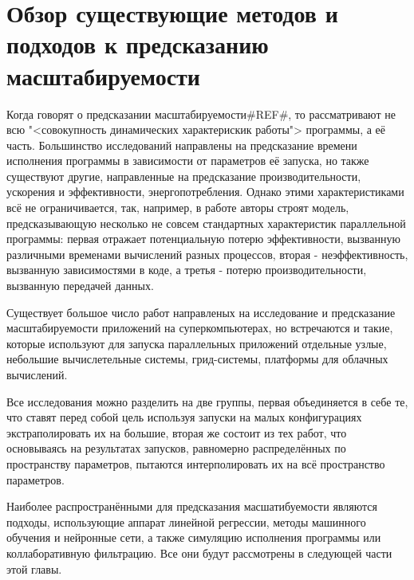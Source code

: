 \chapter{Обзор существующие методов и подходов к предсказанию масштабируемости}
	Когда говорят о предсказании масштабируемости\#REF\#, то рассматривают не всю "<совокупность динамических характерискик работы"> программы, а её часть. Большинство исследований направлены на предсказание времени исполнения программы в зависимости от параметров её запуска, но также существуют другие, направленные на предсказание производительности, ускорения и эффективности, энергопотребления. Однако этими характеристиками всё не ограничивается, так, например, в работе \cite{efficiency_prediction} авторы строят модель, предсказывающую несколько не совсем стандартных характеристик параллельной программы: первая отражает потенциальную потерю эффективности, вызванную различными временами вычислений разных процессов, вторая - неэффективность, вызванную зависимостями в коде, а третья - потерю производительности, вызванную передачей данных.

	Существует большое число работ направленых на исследование и предсказание масштабируемости приложений на суперкомпьютерах, но встречаются и такие, которые используют для запуска параллельных приложений отдельные узлые, небольшие вычислетельные системы, грид-системы, платформы для облачных вычислений.

	Все исследования можно разделить на две группы, первая объединяется в себе те, что ставят перед собой цель используя запуски на малых конфигурациях экстраполировать их на большие, вторая же состоит из тех работ, что основываясь на результатах запусков, равномерно распределённых по пространству параметров, пытаются интерполировать их на всё пространство параметров.

	Наиболее распространёнными для предсказания масшатибуемости являются подходы, использующие аппарат линейной регрессии, методы машинного обучения и нейронные сети, а также симуляцию исполнения программы или коллаборативную фильтрацию. Все они будут рассмотрены в следующей части этой главы.

